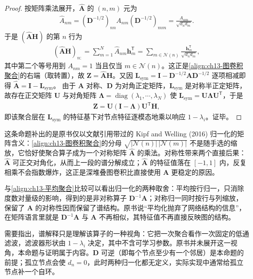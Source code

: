 \documentclass[../../main.tex]{subfiles}
\begin{document}
\begin{proof}
按矩阵乘法展开，$\widehat{\bm{A}}$ 的 $(n,m)$ 元为
\begin{align*}
\widehat{A}_{nm}=\left(\bm{D}^{-1/2}\right)_{nn}A_{nm}\left(\bm{D}^{-1/2}\right)_{mm}=\frac{A_{nm}}{\sqrt{d_n d_m}}.
\end{align*}
于是 $(\widehat{\bm{A}}\bm{H})$ 的第 $n$ 行为
\begin{align*}
\left(\widehat{\bm{A}}\bm{H}\right)_{n:}=\sum_{m=1}^{N}\widehat{A}_{nm}\bm{h}_m^{\mathsf T}=\sum_{m\in\mathcal{N}(n)}\frac{\bm{h}_m^{\mathsf T}}{\sqrt{d_n d_m}},
\end{align*}
其中第二个等号用到 $A_{nm}=1$ 当且仅当 $m\in\mathcal{N}(n)$。这正是\eqref{align:ch13-图卷积聚合}的右端（取转置），故 $\bm{Z}=\widehat{\bm{A}}\bm{H}$。又因 $\bm{L}_{\mathrm{sym}}=\bm{I}-\bm{D}^{-1/2}\bm{A}\bm{D}^{-1/2}$ 逐项相减即得 $\widehat{\bm{A}}=\bm{I}-\bm{L}_{\mathrm{sym}}$。
由于 $\bm{A}$ 对称、$\bm{D}$ 为对角正定矩阵，$\bm{L}_{\mathrm{sym}}$ 是对称半正定矩阵，故存在正交矩阵 $\bm{U}$ 与对角矩阵 $\bm{\Lambda}=\operatorname{diag}(\lambda_1,\cdots,\lambda_N)$ 使 $\bm{L}_{\mathrm{sym}}=\bm{U}\bm{\Lambda}\bm{U}^{\mathsf T}$，于是
\begin{align*}
\bm{Z}=\bm{U}\left(\bm{I}-\bm{\Lambda}\right)\bm{U}^{\mathsf T}\bm{H},
\end{align*}
即该聚合层在 $\bm{L}_{\mathrm{sym}}$ 的特征基下对节点特征逐模态地乘以响应 $1-\lambda_i$。证毕。
\end{proof}

\begin{remark}
这条命题补出的是原书仅以文献引用带过的 Kipf and Welling (2016) 归一化的矩阵含义：\eqref{align:ch13-图卷积聚合}的分母 $\sqrt{|\mathcal{N}(n)|\,|\mathcal{N}(m)|}$ 不是随手选的缩放，它恰好使聚合算子成为一个对称矩阵 $\widehat{\bm{A}}$ 的乘法。对称性带来两个直接后果：$\widehat{\bm{A}}$ 可正交对角化，从而上一段的谱分解成立；$\widehat{\bm{A}}$ 的特征值落在 $[-1,1]$ 内，反复相乘不会指数爆炸，这正是深堆叠图卷积比直接使用 $\bm{A}$ 更稳定的原因。\par
与\eqref{align:ch13-平均聚合}比较可以看出归一化的两种取舍：平均按行归一，只消除度数对量级的影响，得到的是非对称算子 $\bm{D}^{-1}\bm{A}$；对称归一同时按行与列缩放，保留了 $\bm{A}$ 的对称性因而保留了谱结构。原书说“平均化抛弃了网络结构的信息”，在矩阵语言里就是 $\bm{D}^{-1}\bm{A}$ 与 $\bm{A}$ 不再相似，其特征值不再直接反映图的结构。\par
需要指出，谱解释只是理解该算子的一种视角：它把一次聚合看作一次固定的低通滤波，滤波器形状由 $1-\lambda_i$ 决定，其中不含可学习参数。原书并未展开这一视角，本命题与证明属于内容。$\bm{D}$ 可逆（即每个节点至少有一个邻居）是本命题的前提；孤立节点会使 $d_n=0$，此时两种归一化都无定义，实际实现中通常给孤立节点补一个自环。
\end{remark}
\end{document}
